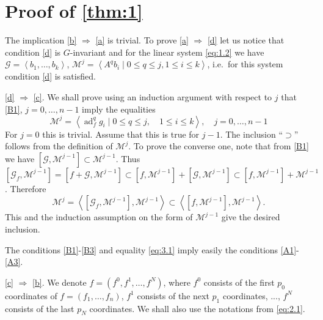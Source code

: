\documentclass[leqno]{article}
\theoremstyle{plain}
\numberwithin{equation}{section}
\newcommand{\ad}{\operatorname{ad}}
\begin{document}
\section{Proof of \texorpdfstring{\cref{thm:1}}{Theorem 1}}

The implication \eqref{b} $\Rightarrow$ \eqref{a} is trivial. 
To prove \eqref{a} $\Rightarrow$ \eqref{d} let us notice that condition \eqref{d} is $G$-invariant and for the linear system \eqref{eq:1.2} we have $\mathscr{G}=\left\langle b_{1}, \ldots, b_{k}\right\rangle$, $\mathscr{M}^{j}=\left\langle A^{q} b_{i} \mid 0 \leqslant q \leqslant j, 1 \leqslant i \leqslant k\right\rangle$, i.e.\ for this system condition \eqref{d} is satisfied.

\bigskip

\eqref{d} $\Rightarrow$ \eqref{c}. 
We shall prove using an induction argument with respect to $j$ that \eqref{B1}, $j=0, \ldots, n-1$ imply the equalities
\begin{equation} \label{eq:3.1}
	\mathscr{M}^{j}=\left\langle \ad_{f}^{q} g_{i} \mid 0 \leqslant q \leqslant j, \quad 1 \leqslant i \leqslant k\right\rangle, \quad j=0, \ldots, n-1
\end{equation}
For $j=0$ this is trivial. Assume that this is true for $j-1$.
The inclusion ``$\supset$'' follows from the definition of $\mathscr{M}^{j}$. 
To prove the converse one, note that from \eqref{B1} we have $\left[\mathscr{G}, \mathscr{M}^{j-1}\right] \subset \mathscr{M}^{j-1}$. Thus $\left[\mathscr{G}_{f}, \mathscr{M}^{j-1}\right]=\left[f+\mathscr{G}, \mathscr{M}^{j-1}\right] \subset\left[f, \mathscr{M}^{j-1}\right]+\left[\mathscr{G}, \mathscr{M}^{j-1}\right] \subset \left[f, \mathscr{M}^{j-1}\right]+\mathscr{M}^{j-1}$. Therefore
\begin{equation*}
	\mathscr{M}^{j}=\left\langle\left[\mathscr{G}_{f}, \mathscr{M}^{j-1}\right], \mathscr{M}^{j-1}\right\rangle \subset\left\langle\left[f, \mathscr{M}^{j-1}\right], \mathscr{M}^{j-1}\right\rangle .
\end{equation*}
This and the induction assumption on the form of $\mathscr{M}^{j-1}$ give the desired inclusion.

The conditions \eqref{B1}-\eqref{B3} and equality \eqref{eq:3.1} imply easily the conditions \eqref{A1}-\eqref{A3}.

\bigskip

\eqref{c} $\Rightarrow$ \eqref{b}. 
We denote $f=\left(f^{0}, f^{1}, \ldots, f^{N}\right)$, where $f^{0}$ consists of the first $p_{0}$ coordinates of $f=\left(f_{1}, \ldots, f_{n}\right)$, $f^{1}$ consists of the next $p_{1}$ coordinates, ..., $f^{N}$ consists of the last $p_N$ coordinates.
We shall also use the notations from \eqref{eq:2.1}.
\end{document}
